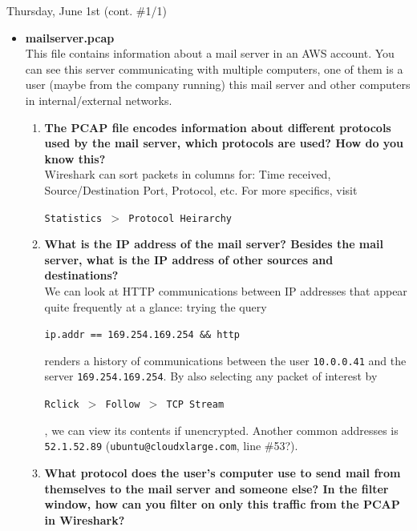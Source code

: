 \documentclass[11pt]{article}
\newcommand\codebox[1]{
    \noindent\hspace{-0.25em}\begin{tcolorbox}[on line, hbox, colback = codeblack, colframe = codeborder, coltext = white, boxrule = 1.5pt, left = 2pt, right = 2pt, top = 0.5pt, bottom = 0.5pt]
    \small\texttt{#1}\normalsize
    \end{tcolorbox}\hspace{-0.25em}
}
\begin{document}
\begin{bloodorangebox}{Thursday, June 1st \hspace{0.2cm}(cont. \#1/1)\vspace{-2.2em}\begin{flushright}\large {}\end{flushright}}
    \begin{itemize}
        \item\LARGE\textbf{mailserver.pcap} \\
        \normalsize This file contains information about a mail server in an AWS account. You can see this server communicating with multiple computers, one of them is a user (maybe from the company running) this mail server and other computers in internal/external networks.
        \begin{enumerate}
            \item \textbf{The PCAP file encodes information about different protocols used by the mail server, which protocols are used? How do you know this?} \\
        
            \vspace{-1em}
            Wireshark can sort packets in columns for: Time received, Source/Destination Port, Protocol, etc. For more specifics, visit \codebox{Statistics $>$ Protocol Heirarchy}
            \item \textbf{What is the IP address of the mail server? Besides the mail server, what is the IP address of other sources and destinations?} \\
        
            \vspace{-1em}
            We can look at HTTP communications between IP addresses that appear quite frequently at a glance: trying the query \codebox{ip.addr == 169.254.169.254 \&\& http} renders a history of communications between the user \texttt{10.0.0.41} and the server \texttt{169.254.169.254}. By also selecting any packet of interest by \codebox{Rclick $>$ Follow $>$ TCP Stream}, we can view its contents if unencrypted. Another common addresses is \texttt{52.1.52.89} (\texttt{ubuntu@cloudxlarge.com}, line \#53?).
            \item \textbf{What protocol does the user's computer use to send mail from themselves to the mail server and someone else? In the filter window, how can you filter on only this traffic from the PCAP in Wireshark?} \\
        

\end{enumerate}
\end{itemize}
\end{bloodorangebox}
\end{document}
